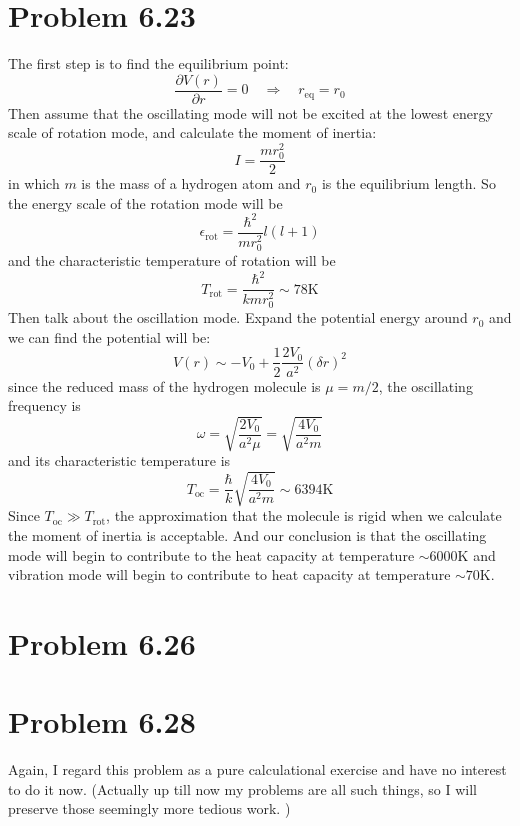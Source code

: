 \documentclass{article}
\begin{document}
\section*{Problem 6.23}
The first step is to find the equilibrium point:
$$
\frac{\partial V(r)}{\partial r} = 0\quad\Rightarrow\quad r_{\mathrm{eq}} = r_0 
$$
Then assume that the oscillating mode will not be excited at the lowest energy scale of rotation mode, and calculate the moment of inertia:
$$
I = \frac{mr_0^2}{2}
$$
in which $m$ is the mass of a hydrogen atom and $r_0$ is the equilibrium length. So the energy scale of the rotation mode will be
\begin{equation}
\epsilon_{\mathrm{rot}} = \frac{\hbar^2}{mr_0^2}l(l+1)
\end{equation}
and the characteristic temperature of rotation will be
$$
T_{\mathrm{rot}} = \frac{\hbar^2}{kmr_0^2} \sim 78\mathrm{K}
$$
Then talk about the oscillation mode. Expand the potential energy around $r_0$ and we can find the potential will be:
\begin{equation}
V(r)\sim -V_0 + \frac{1}{2}\frac{2V_0}{a^2}(\delta r)^2
\end{equation}
since the reduced mass of the hydrogen molecule is $\mu = m/2$, the oscillating frequency is
\begin{equation}
\omega = \sqrt{\frac{2V_0}{a^2\mu}} = \sqrt{\frac{4V_0}{a^2 m}}
\end{equation}
and its characteristic temperature is
$$
T_{\mathrm{oc}} = \frac{\hbar}{k}\sqrt{\frac{4V_0}{a^2 m}}\sim 6394\mathrm{K}
$$
Since $T_{\mathrm{oc}}\gg T_\mathrm{rot}$, the approximation that the molecule is rigid when we calculate the moment of inertia is acceptable. And our conclusion is that the oscillating mode will begin to contribute to the heat capacity at temperature $\sim 6000\mathrm{K}$ and vibration mode will begin to contribute to heat capacity at temperature $\sim 70\mathrm{K}$.

\section*{Problem 6.26} %
\label{sec:problem_6_26}
	


\section*{Problem 6.28}
Again, I regard this problem as a pure calculational exercise and have no interest to do it now. (Actually up till now my problems are all such things, so I will preserve those seemingly more tedious work. )
\end{document}

